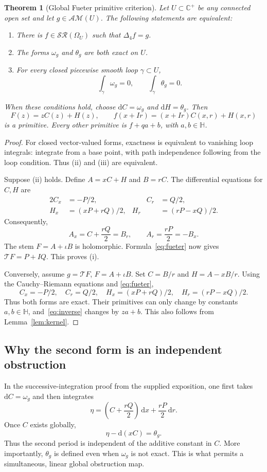 \documentclass[11pt,a4paper]{article}
\numberwithin{equation}{section}
\newtheorem{theorem}{Theorem}[section]
\theoremstyle{definition}
\theoremstyle{remark}
\newcommand{\C}{\mathbb C}
\newcommand{\HH}{\mathbb H}
\newcommand{\AM}{\mathcal{AM}}
\newcommand{\SR}{\mathcal{SR}}
\newcommand{\T}{\mathcal T}
\newcommand{\Lap}{\Delta_4}
\newcommand{\dx}{\,\mathrm dx}
\newcommand{\dr}{\,\mathrm dr}
\begin{document}
\begin{theorem}[Global Fueter primitive criterion]\label{thm:period}
Let $U\subset\C^+$ be any connected open set and let $g\in\AM(U)$.
The following statements are equivalent:
\begin{enumerate}[label=\textup{(\roman*)}]
 \item There is $f\in\SR(\Omega_U)$ such that $\Lap f=g$.
 \item The forms $\omega_g$ and $\theta_g$ are both exact on $U$.
 \item For every closed piecewise smooth loop $\gamma\subset U$,
 \[
   \int_\gamma\omega_g=0,\qquad\int_\gamma\theta_g=0.
 \]
\end{enumerate}
When these conditions hold, choose $\mathrm dC=\omega_g$ and
$\mathrm dH=\theta_g$. Then
\begin{equation}
 F(z)=zC(z)+H(z),\qquad f(x+Ir)=(x+Ir)C(x,r)+H(x,r)
 \label{eq:inverse}
\end{equation}
is a primitive. Every other primitive is $f+qa+b$, with $a,b\in\HH$.
\end{theorem}
\begin{proof}
For closed vector-valued forms, exactness is equivalent to vanishing
loop integrals: integrate from a base point, with path independence
following from the loop condition. Thus (ii) and (iii) are equivalent.

Suppose (ii) holds. Define $A=xC+H$ and $B=rC$. The differential equations
for $C,H$ are
\begin{alignat*}{2}
 C_x&=-P/2,&\qquad C_r&=Q/2,\\
 H_x&=(xP+rQ)/2,& H_r&=(rP-xQ)/2.
\end{alignat*}
Consequently,
\[
 A_x=C+\frac{rQ}{2}=B_r,\qquad
 A_r=\frac{rP}{2}=-B_x.
\]
The stem $F=A+\iota B$ is holomorphic. Formula~\eqref{eq:fueter} now gives
$\T F=P+IQ$. This proves (i).

Conversely, assume $g=\T F$, $F=A+\iota B$. Set $C=B/r$ and
$H=A-xB/r$. Using the Cauchy--Riemann equations and
\eqref{eq:fueter},
\[
 C_x=-P/2,\quad C_r=Q/2,\quad
 H_x=(xP+rQ)/2,\quad H_r=(rP-xQ)/2.
\]
Thus both forms are exact. Their primitives can only change by constants
$a,b\in\HH$, and~\eqref{eq:inverse} changes by $za+b$.
This also follows from Lemma~\ref{lem:kernel}.
\end{proof}

\subsection{Why the second form is an independent obstruction}
In the successive-integration proof from the supplied exposition, one
first takes $\mathrm dC=\omega_g$ and then integrates
\[
 \eta=\left(C+\frac{rQ}{2}\right)\dx+\frac{rP}{2}\dr.
\]
Once $C$ exists globally,
\begin{equation}
 \eta-\mathrm d(xC)=\theta_g.
 \label{eq:eta-theta}
\end{equation}
Thus the second period is independent of the additive constant in $C$.
More importantly, $\theta_g$ is defined even when $\omega_g$ is not exact.
This is what permits a simultaneous, linear global obstruction map.
\end{document}
